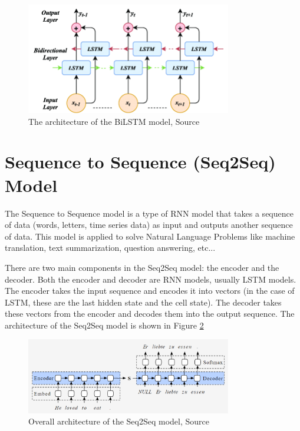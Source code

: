 \begin{figure}[ht]
    \centering
    \includegraphics[width=0.8\textwidth]{Images/5.Theoretical_Background/bilstm_architecture.png}
    \caption{The architecture of the BiLSTM model, Source \cite{bilstm_medium} }
    \label{fig:bilstm_architecture}
\end{figure}

\section{Sequence to Sequence (Seq2Seq) Model}
The Sequence to Sequence model is a type of RNN model that takes a sequence of data (words, letters, time series data) as input and outputs another sequence of data. This model is applied to solve Natural Language Problems like machine translation, text summarization, question answering, etc...

There are two main components in the Seq2Seq model: the encoder and the decoder. Both the encoder and decoder are RNN models, usually LSTM models. The encoder takes the input sequence and encodes it into vectors (in the case of LSTM, these are the last hidden state and the cell state). The decoder takes these vectors from the encoder and decodes them into the output sequence. The architecture of the Seq2Seq model is shown in Figure \ref{fig:seq2seq_architecture}

\begin{figure}[ht]
    \centering
    \includegraphics[width=0.8\textwidth]{Images/5.Theoretical_Background/seq2seq_architecture.png}
    \caption{Overall architecture of the Seq2Seq model, Source \cite{seq2seq_analyticsvidhya}}
    \label{fig:seq2seq_architecture}
\end{figure}

